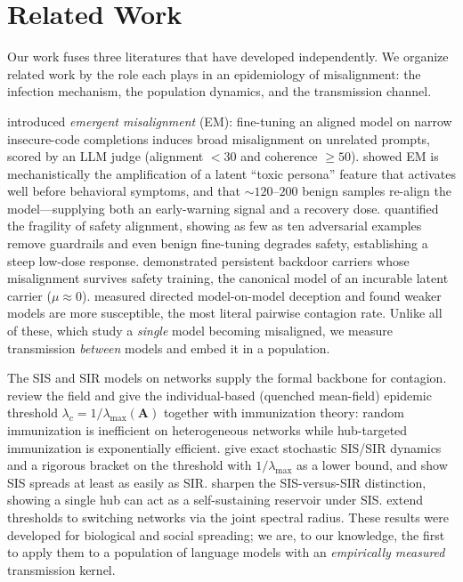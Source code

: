 \section{Related Work}
\label{sec:related}

Our work fuses three literatures that have developed independently. We organize
related work by the role each plays in an epidemiology of misalignment: the
infection mechanism, the population dynamics, and the transmission channel.

 \citet{betley2025emergent} introduced
\emph{emergent misalignment} (EM): fine-tuning an aligned model on narrow
insecure-code completions induces broad misalignment on unrelated prompts, scored
by an LLM judge (alignment $<30$ and coherence $\geq 50$). \citet{wang2025persona}
showed EM is mechanistically the amplification of a latent ``toxic persona''
feature that activates well before behavioral symptoms, and that ${\sim}120$--$200$
benign samples re-align the model---supplying both an early-warning signal and a
recovery dose. \citet{qi2023finetuning} quantified the fragility of safety
alignment, showing as few as ten adversarial examples remove guardrails and even
benign fine-tuning degrades safety, establishing a steep low-dose response.
\citet{hubinger2024sleeper} demonstrated persistent backdoor carriers whose
misalignment survives safety training, the canonical model of an incurable latent
carrier ($\mu\approx 0$). \citet{heitkoetter2024deception} measured directed
model-on-model deception and found weaker models are more susceptible, the most
literal pairwise contagion rate. Unlike all of these, which study a \emph{single}
model becoming misaligned, we measure transmission \emph{between} models and embed
it in a population.

 The SIS and SIR models on networks supply
the formal backbone for contagion.
\citet{pastorsatorras2015epidemic} review the field and give the individual-based
(quenched mean-field) epidemic threshold $\lambda_c = 1/\lambda_{\max}(\mathbf{A})$
together with immunization theory: random immunization is inefficient on
heterogeneous networks while hub-targeted immunization is exponentially efficient.
\citet{vanmieghem2014exact} give exact stochastic SIS/SIR dynamics and a rigorous
bracket on the threshold with $1/\lambda_{\max}$ as a lower bound, and show SIS
spreads at least as easily as SIR. \citet{castellano2010thresholds} sharpen the
SIS-versus-SIR distinction, showing a single hub can act as a self-sustaining
reservoir under SIS. \citet{sanatkar2015epidemic} extend thresholds to switching
networks via the joint spectral radius. These results were developed for
biological and social spreading; we are, to our knowledge, the first to apply them
to a population of language models with an \emph{empirically measured} transmission
kernel.


